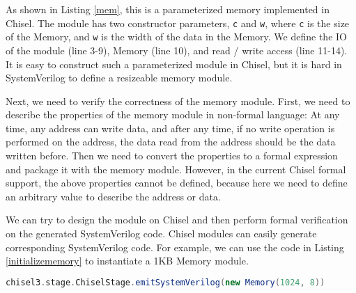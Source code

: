 \documentclass[conference]{IEEEtran}
\theoremstyle{definition}
\begin{document}
As shown in Listing \ref{mem}, this is a parameterized memory implemented in Chisel. The module has two constructor parameters, \verb|c| and \verb|w|, where \verb|c| is the size of the Memory, and \verb|w| is the width of the data in the Memory. We define the IO of the module (line 3-9), Memory (line 10), and read / write access  (line 11-14). It is easy to construct such a parameterized module in Chisel, but it is hard in SystemVerilog to define a resizeable memory module.

Next, we need to verify the correctness of the memory module. First, we need to describe the properties of the memory module in non-formal language: At any time, any address can write data, and after any time, if no write operation is performed on the address, the data read from the address should be the data written before. Then we need to convert the properties to a formal expression and package it with the memory module.
However, in the current Chisel formal support, the above properties cannot be defined, because here we need to define an arbitrary value to describe the address or data.

We can try to design the module on Chisel and then perform formal verification on the generated SystemVerilog code.
Chisel modules can easily generate corresponding SystemVerilog code. For example, we can use the code in Listing \ref{initializememory} to instantiate a 1KB Memory module.

\begin{lstlisting}[language=Scala, caption={A Chisel code fragment using to instantiate 1KB Memory module in SystemVerilog}, label={initializememory}]
chisel3.stage.ChiselStage.emitSystemVerilog(new Memory(1024, 8))
\end{lstlisting}
\end{document}
